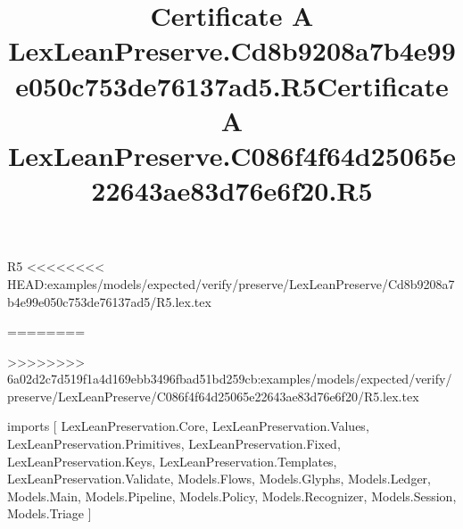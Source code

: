 \begin{lexlean}{R5}
<<<<<<<< HEAD:examples/models/expected/verify/preserve/LexLeanPreserve/Cd8b9208a7b4e99e050c753de76137ad5/R5.lex.tex
\title{Certificate A LexLeanPreserve.Cd8b9208a7b4e99e050c753de76137ad5.R5}
========
\title{Certificate A LexLeanPreserve.C086f4f64d25065e22643ae83d76e6f20.R5}
>>>>>>>> 6a02d2c7d519f1a4d169ebb3496fbad51bd259cb:examples/models/expected/verify/preserve/LexLeanPreserve/C086f4f64d25065e22643ae83d76e6f20/R5.lex.tex
\begin{coremodule}
imports [
  LexLeanPreservation.Core,
  LexLeanPreservation.Values,
  LexLeanPreservation.Primitives,
  LexLeanPreservation.Fixed,
  LexLeanPreservation.Keys,
  LexLeanPreservation.Templates,
  LexLeanPreservation.Validate,
  Models.Flows,
  Models.Glyphs,
  Models.Ledger,
  Models.Main,
  Models.Pipeline,
  Models.Policy,
  Models.Recognizer,
  Models.Session,
  Models.Triage
]


\end{coremodule}
\end{lexlean}

